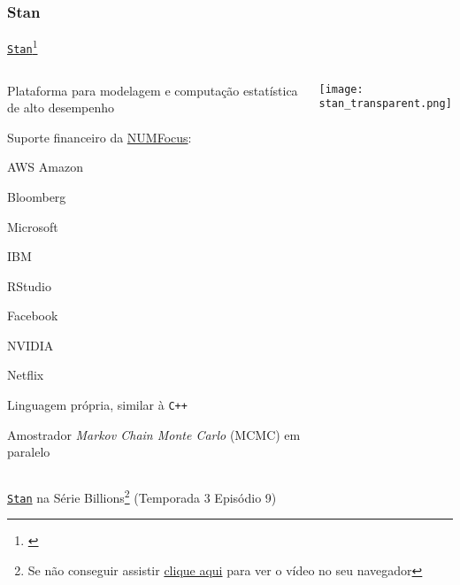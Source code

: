 \subsubsection{Stan}

\begin{frame}{\href{https://mc-stan.org}{\texttt{Stan}}\footnote{\textcite{carpenterStanProbabilisticProgramming2017}}}
    \begin{columns}
        \begin{column}{0.8\textwidth}
            \begin{vfilleditems}
                \small
                \item Plataforma para modelagem e computação estatística de alto desempenho
                \item Suporte financeiro da \href{https://numfocus.org/}{NUMFocus}:
                \begin{vfilleditems}
                    \footnotesize
                    \item AWS Amazon
                    \item Bloomberg
                    \item Microsoft
                    \item IBM
                    \item RStudio
                    \item Facebook
                    \item NVIDIA
                    \item Netflix
                \end{vfilleditems}
                \small
                \item Linguagem própria, similar à \texttt{C++}
                \item Amostrador \textit{Markov Chain Monte Carlo} (MCMC) em paralelo
            \end{vfilleditems}
        \end{column}
        \begin{column}{0.2\textwidth}
            \centering
            \texttt{[image: stan\_transparent.png]}
        \end{column}
    \end{columns}
\end{frame}

\begin{frame}{\href{https://mc-stan.org}{\texttt{Stan}} na Série Billions\footnote{Se não conseguir assistir \href{https://github.com/storopoli/Estatistica-Bayesiana/blob/master/images/stan_billions_subtitled.mp4?raw=true}{clique aqui} para ver o vídeo no seu navegador} (Temporada 3 Episódio 9)}
    \centering
  \end{frame}

